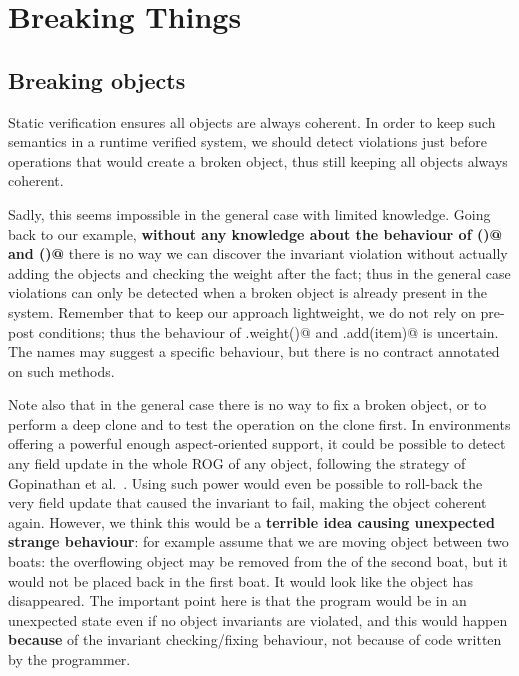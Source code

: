  


 

\section{Breaking Things}
\label{s:example}
\saveSpace

\subsection{Breaking objects}
\saveSpace
Static verification ensures all objects are always coherent.
In order to keep such semantics in a runtime verified system,
we should detect violations just before operations that would create a broken object,
thus still keeping all objects always coherent.

Sadly, this seems impossible in the general case with limited knowledge.
Going back to our \Q@Boat@ example,
\textbf{without any knowledge about the behaviour of \Q@add()@ and \Q@weight()@}%
there is no way we can discover the invariant violation without actually adding the objects and checking the 
weight after the fact; thus in the general case violations can only be detected 
when a broken object is already present in the system.
Remember that to keep our approach lightweight,
we do not rely on pre-post conditions; thus
the behaviour of \Q@Items.weight()@ and \Q@Items.add(item)@ is uncertain.
The names may suggest a specific behaviour, but there is no contract annotated on such methods.

Note also that in the general case there is no way to fix a broken object,
or to perform a deep clone and to test the operation on the clone first.
In environments offering a powerful enough aspect-oriented support,
it could be possible to detect any field update in the whole ROG of
any object, following the strategy of 
Gopinathan et al.~\cite{Gopinathan:2008:RMO:1483018.1483028}.
Using such power would even be possible to roll-back the very field update that caused 
the invariant to fail, making the object coherent again.
However, we think this would be a \textbf{terrible idea causing unexpected strange behaviour}: for example
assume that we are moving object between two boats:
the overflowing object may be removed from the \Q@cargo@ of the second boat, but it would not
be placed back in the first boat. It would look like the object has disappeared.
The important point here is that the program would be in an unexpected state
even if no object invariants are violated, and this would happen \textbf{because} of the 
invariant checking/fixing behaviour, not because of code written by the programmer.


